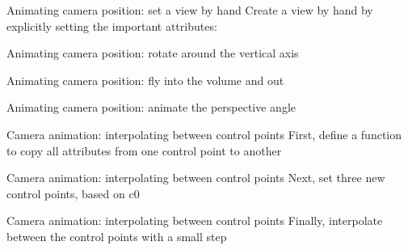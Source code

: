 \begin{frame}{Animating camera position: set a view by hand}
  Create a view by hand by explicitly setting the important attributes:
  
\end{frame}

\begin{frame}{Animating camera position: rotate around the vertical axis}
  
\end{frame}

\begin{frame}{Animating camera position: fly into the volume and out}
  
\end{frame}

\begin{frame}{Animating camera position: animate the perspective angle}
  
\end{frame}

\begin{frame}{Camera animation: interpolating between control points}
  First, define a function to copy all attributes from one control point to another
  
\end{frame}

\begin{frame}{Camera animation: interpolating between control points}
  Next, set three new control points, based on c0
  
\end{frame}

\begin{frame}{Camera animation: interpolating between control points}
  Finally, interpolate between the control points with a small step
  
\end{frame}

